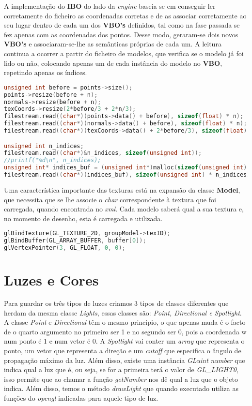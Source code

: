 \documentclass[14pt, a4 paper]{report}
\begin{document}
A implementação do \textbf{IBO} do lado da \textit{engine} baseia-se em conseguir ler corretamente do ficheiro as coordenadas corretas e de as associar corretamente ao seu lugar dentro de cada um dos \textbf{VBO's} definidos, tal como na fase passada se fez apenas com as coordenadas dos pontos. Desse modo, geraram-se dois novos \textbf{VBO's} e associaram-se-lhe as semânticas próprias de cada um. A leitura continua a ocorrer a partir do ficheiro de modelos, que verifica se o modelo já foi lido ou não, colocando apenas um de cada instância do modelo no \textbf{VBO}, repetindo apenas os índices. 

\begin{lstlisting}[language = c++]
unsigned int before = points->size();
points->resize(before + n);
normals->resize(before + n);
texCoords->resize(2*before/3 + 2*n/3);
filestream.read((char*)(points->data() + before), sizeof(float) * n);
filestream.read((char*)(normals->data() + before), sizeof(float) * n);
filestream.read((char*)(texCoords->data() + 2*before/3), sizeof(float) * 2*n/3);

unsigned int n_indices;
filestream.read((char*)&n_indices, sizeof(unsigned int));
//printf("%d\n", n_indices);
unsigned int* indices_buf = (unsigned int*)malloc(sizeof(unsigned int) * n_indices);
filestream.read((char*)(indices_buf), sizeof(unsigned int) * n_indices);
\end{lstlisting}

Uma característica importante  das texturas está na expansão da classe \textbf{Model}, que necessita que se lhe associe o \textit{char} correspondente à textura que foi carregada, quando encontrada no \textit{xml}. Cada modelo saberá qual a sua textura e, no momento de desenho, esta é carregada e utilizada.

\begin{lstlisting}[language = c++]
glBindTexture(GL_TEXTURE_2D, groupModel->texID);
glBindBuffer(GL_ARRAY_BUFFER, buffer[0]);
glVertexPointer(3, GL_FLOAT, 0, 0);
\end{lstlisting}

\section{Luzes e Cores}

Para guardar os três tipos de luzes criamos 3 tipos de classes diferentes que herdam da mesma classe \textit{Lights}, essas classes são: \textit{Point, Directional e Spotlight}. A classe \textit{Point} e \textit{Directional} têm o mesmo principio, o que apenas muda é o facto de o quarto argumento no primeiro ser 1 e no segundo ser 0, pois a coordenada w num ponto é 1 e num vetor é 0. A \textit{Spotlight} vai conter um \textit{array} que representa o ponto, um vetor que representa a direção e um \textit{cutoff} que especifica o ângulo de propagação máximo da luz. Além disso, existe uma instância \textit{GLuint} \textit{number} que indica qual a luz que é, ou seja, se for a primeira terá o valor de \textit{GL\_LIGHT0}, isso permite que ao chamar a função \textit{getNumber} nos dê qual a luz que o objeto indica. Além disso, temos o método \textit{drawLight} que quando executado utiliza as funções do \textit{opengl} indicadas para aquele tipo de luz.
\end{document}
